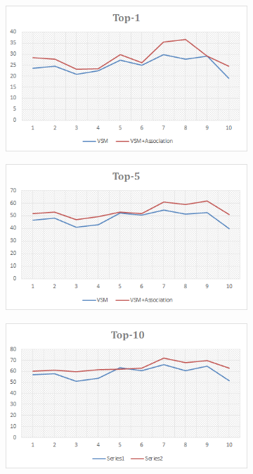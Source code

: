\documentclass[conference]{IEEEtran}
\begin{document}
\begin{figure}
	\begin{subfigure}[b]{0.33\textwidth}
		\centering
		\includegraphics[width=\textwidth]{VSM+AssoTop-1}
	\end{subfigure}
	\begin{subfigure} [b]{0.33\textwidth}
		\centering
		\includegraphics[width=\textwidth]{VSM+AssoTop-5}
	\end{subfigure}
	\begin{subfigure} [b]{0.33\textwidth}
		\centering
		\includegraphics[width=\textwidth]{VSM+AssoTop-10}
	\end{subfigure}
	

\end{figure}
\end{document}
